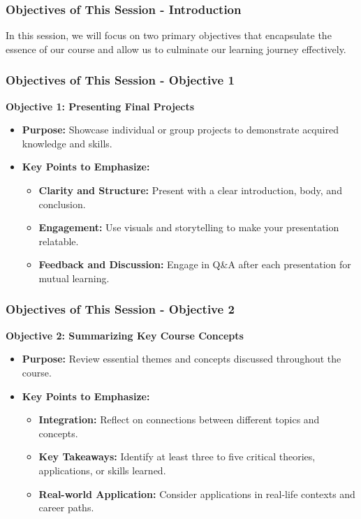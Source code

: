 \documentclass[aspectratio=169]{beamer}
\begin{document}
\begin{frame}[fragile]
    \frametitle{Objectives of This Session - Introduction}
    In this session, we will focus on two primary objectives that encapsulate the essence of our course and allow us to culminate our learning journey effectively.
\end{frame}

\begin{frame}[fragile]
    \frametitle{Objectives of This Session - Objective 1}
    \textbf{Objective 1: Presenting Final Projects}

    \begin{itemize}
        \item \textbf{Purpose:} Showcase individual or group projects to demonstrate acquired knowledge and skills.
        \item \textbf{Key Points to Emphasize:}
            \begin{itemize}
                \item \textbf{Clarity and Structure:} Present with a clear introduction, body, and conclusion.
                \item \textbf{Engagement:} Use visuals and storytelling to make your presentation relatable.
                \item \textbf{Feedback and Discussion:} Engage in Q\&A after each presentation for mutual learning.
            \end{itemize}
    \end{itemize}
\end{frame}

\begin{frame}[fragile]
    \frametitle{Objectives of This Session - Objective 2}
    \textbf{Objective 2: Summarizing Key Course Concepts}

    \begin{itemize}
        \item \textbf{Purpose:} Review essential themes and concepts discussed throughout the course.
        \item \textbf{Key Points to Emphasize:}
            \begin{itemize}
                \item \textbf{Integration:} Reflect on connections between different topics and concepts.
                \item \textbf{Key Takeaways:} Identify at least three to five critical theories, applications, or skills learned.
                \item \textbf{Real-world Application:} Consider applications in real-life contexts and career paths.
            \end{itemize}
    \end{itemize}
\end{frame}
\end{document}
